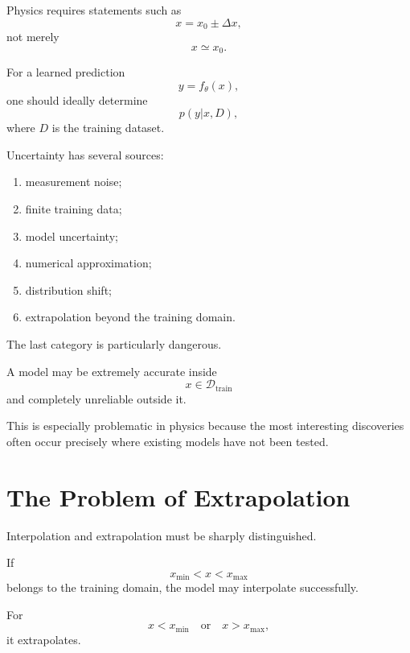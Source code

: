 \documentclass[11pt,a4paper]{article}
\begin{document}
Physics requires statements such as
\begin{equation}
x=x_0\pm\Delta x,
\end{equation}
not merely
\begin{equation}
x\simeq x_0.
\end{equation}

For a learned prediction
\begin{equation}
y=f_\theta(x),
\end{equation}
one should ideally determine
\begin{equation}
p(y|x,D),
\end{equation}
where $D$ is the training dataset.

Uncertainty has several sources:

\begin{enumerate}
\item measurement noise;
\item finite training data;
\item model uncertainty;
\item numerical approximation;
\item distribution shift;
\item extrapolation beyond the training domain.
\end{enumerate}

The last category is particularly dangerous.

A model may be extremely accurate inside
\begin{equation}
x\in\mathcal{D}_{\mathrm{train}}
\end{equation}
and completely unreliable outside it.

This is especially problematic in physics because the most interesting discoveries
often occur precisely where existing models have not been tested.

\section{The Problem of Extrapolation}

Interpolation and extrapolation must be sharply distinguished.

If
\begin{equation}
x_{\min}<x<x_{\max}
\end{equation}
belongs to the training domain, the model may interpolate successfully.

For
\begin{equation}
x<x_{\min}
\quad\text{or}\quad
x>x_{\max},
\end{equation}
it extrapolates.
\end{document}
